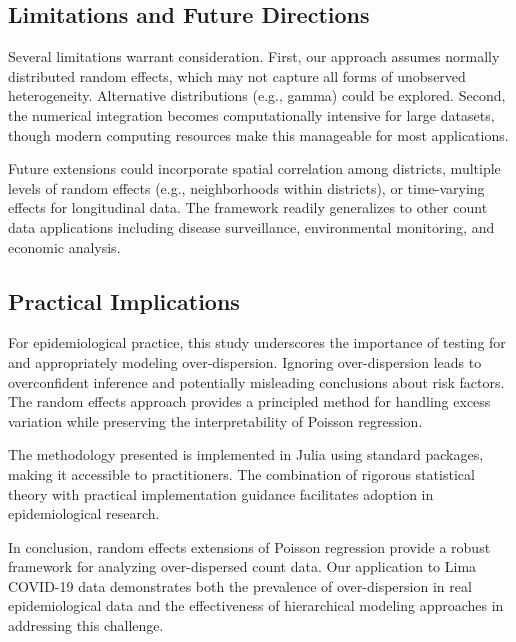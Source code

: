 \documentclass[11pt]{article}
\begin{document}
\subsection{Limitations and Future Directions}

Several limitations warrant consideration. First, our approach assumes normally distributed random effects, which may not capture all forms of unobserved heterogeneity. Alternative distributions (e.g., gamma) could be explored. Second, the numerical integration becomes computationally intensive for large datasets, though modern computing resources make this manageable for most applications.

Future extensions could incorporate spatial correlation among districts, multiple levels of random effects (e.g., neighborhoods within districts), or time-varying effects for longitudinal data. The framework readily generalizes to other count data applications including disease surveillance, environmental monitoring, and economic analysis.

\subsection{Practical Implications}

For epidemiological practice, this study underscores the importance of testing for and appropriately modeling over-dispersion. Ignoring over-dispersion leads to overconfident inference and potentially misleading conclusions about risk factors. The random effects approach provides a principled method for handling excess variation while preserving the interpretability of Poisson regression.

The methodology presented is implemented in Julia using standard packages, making it accessible to practitioners. The combination of rigorous statistical theory with practical implementation guidance facilitates adoption in epidemiological research.

In conclusion, random effects extensions of Poisson regression provide a robust framework for analyzing over-dispersed count data. Our application to Lima COVID-19 data demonstrates both the prevalence of over-dispersion in real epidemiological data and the effectiveness of hierarchical modeling approaches in addressing this challenge.
\end{document}
